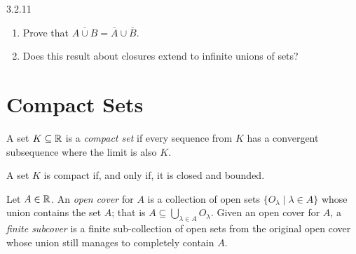 \begin{exercise}
    {3.2.11} \begin{enumerate}
        \item Prove that \(\overline{A \cup B} = \overline{A} \cup \overline{B}\).
        \item Does this result about closures extend to infinite unions of sets?
    \end{enumerate}
\end{exercise}


\renewcommand{\theenumi}{\arabic{enumi}}
\renewcommand{\labelenumi}{\theenumi.}
\section{Compact Sets}

\begin{definition}
    A set \(K \subseteq \mathbb{R}\) is a \textit{compact set} if every sequence from \(K\) has a convergent subsequence where the limit is also \(K\).
\end{definition}

\begin{theorem}
    A set \(K\) is compact if, and only if, it is closed and bounded.
\end{theorem}


\begin{definition}
    Let \(A \in \mathbb{R}\). An \textit{open cover} for \(A\) is a collection of open sets \(\{O_\lambda \mid \lambda \in A\}\) whose union contains the set \(A\); that is \(A \subseteq \bigcup_{\lambda \in A}O_\lambda\). Given an open cover for \(A\), a \textit{finite subcover} is a finite sub-collection of open sets from the original open cover whose union still manages to completely contain \(A\).
\end{definition}

